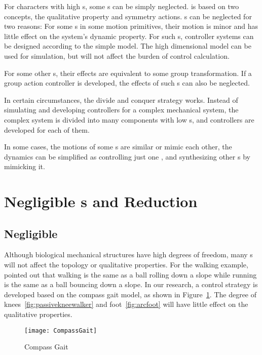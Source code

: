 \begin{itemize}
For characters with high {\dof}s, some {\dof}s can be simply neglected.
\moit is based on two concepts, the qualitative property and symmetry actions.
\dof s can be neglected for two reasons:
For some {\dof}s in some motion primitives, their motion is minor and has little effect on the system's dynamic property.
For such {\dof}s, controller systems can be designed according to the simple model. 
The high dimensional model can be used for simulation, but will not affect the burden of control calculation.

For some other {\dof}s, their effects are equivalent to some group transformation.
If a group action controller is developed, the effects of such {\dof}s can also be neglected.

In certain circumstances, the divide and conquer strategy works.
Instead of simulating and developing controllers for a complex mechanical system, the complex system is divided into many  components with low {\dof}s, and controllers are developed for each of them.

In some cases, the motions of some {\dof}s are similar or mimic each other, the dynamics can be simplified as controlling just one {\dof}, and synthesizing other {\dof}s by mimicking it.
\end{itemize} 

\section{Negligible {\dof}s and Reduction}
\subsection{Negligible \dof}
Although biological mechanical structures have high degrees of freedom, many {\dof}s will not affect the topology or qualitative properties.
For the walking example, \citet{Raibert1986} pointed out that walking is the same as a ball rolling down a slope while running is the same as a ball bouncing down a slope.
In our research, a control strategy is developed based on the compass gait model, as shown in Figure~\ref{fig:compassgait}.
The degree of knees~\ref{fig:passivekneewalker} and foot~\ref{fig:arcfoot} will have little effect on the qualitative properties.
\begin{figure}[!htbp]
  \begin{center}
      \texttt{[image: CompassGait]}
    \caption{Compass Gait}
    \label{fig:compassgait}
\end{center}
\end{figure}



